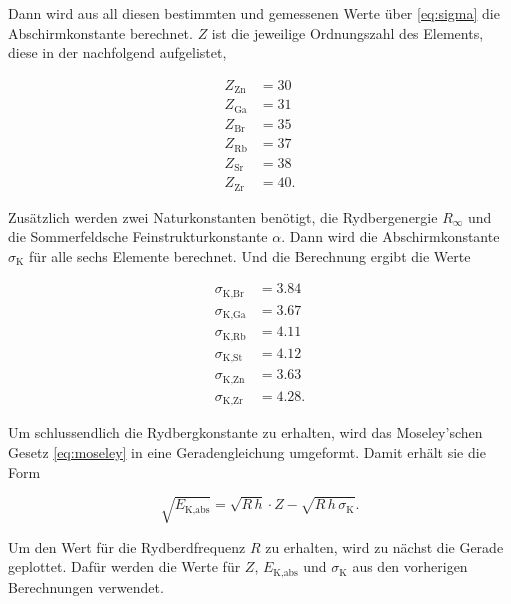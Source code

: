 Dann wird aus all diesen bestimmten und gemessenen Werte über \eqref{eq:sigma} die Abschirmkonstante berechnet.
$Z$ ist die jeweilige Ordnungszahl des Elements, diese in der nachfolgend aufgelistet,

\begin{align*}
    Z_\text{Zn} &= 30\\
    Z_\text{Ga} &= 31\\
    Z_\text{Br} &= 35\\
    Z_\text{Rb} &= 37\\
    Z_\text{Sr} &= 38\\
    Z_\text{Zr} &= 40.
\end{align*}

Zusätzlich werden zwei Naturkonstanten benötigt, die Rydbergenergie $R_\infty$ und die Sommerfeldsche Feinstrukturkonstante $\alpha$. \cite{physics_constants}
Dann wird die Abschirmkonstante $\sigma _\text{K}$ für alle sechs Elemente berechnet.
Und die Berechnung ergibt die Werte

\begin{align*}
    \sigma_\text{K,Br} &= 3.84\\
    \sigma_\text{K,Ga} &= 3.67\\
    \sigma_\text{K,Rb} &= 4.11\\
    \sigma_\text{K,St} &= 4.12\\
    \sigma_\text{K,Zn} &= 3.63\\
    \sigma_\text{K,Zr} &= 4.28.
\end{align*}

Um schlussendlich die Rydbergkonstante zu erhalten, wird das Moseley'schen Gesetz \eqref{eq:moseley} in eine Geradengleichung umgeformt.
Damit erhält sie die Form 

\begin{equation}
    \sqrt{E_\text{K,abs}} = \sqrt{R \, h} \cdot Z - \sqrt{R \, h \, \sigma_\text{K}}.
\end{equation}

Um den Wert für die Rydberdfrequenz $R$ zu erhalten, wird zu nächst die Gerade geplottet.
Dafür werden die Werte für $Z$, $E_\text{K,abs}$ und $\sigma_\text{K}$ aus den vorherigen Berechnungen verwendet.